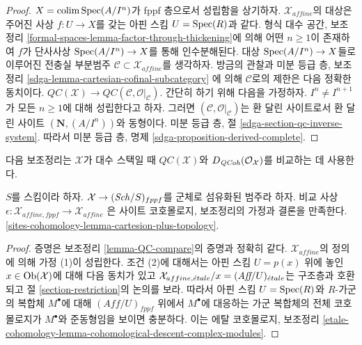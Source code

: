 \begin{proof}
 $X = \mathop{\mathrm{colim}}\nolimits \mathop{\mathrm{Spec}}(A/I^n)$가 fppf 층으로서 성립함을 상기하자.
$\mathcal{X}_{affine}$의 대상은 주어진 사상 $f : U \to X$를 갖는
아핀 스킴 $U = \mathop{\mathrm{Spec}}(R)$과 같다. 형식 대수 공간, 보조정리
\ref{formal-spaces-lemma-factor-through-thickening}에 의해 어떤
$n \geq 1$이 존재하여 $f$가 단사사상
$\mathop{\mathrm{Spec}}(A/I^n) \to X$를 통해 인수분해된다.
대상 $\mathop{\mathrm{Spec}}(A/I^n) \to X$들로 이루어진 전충실 부분범주
$\mathcal{C} \subset \mathcal{X}_{affine}$를 생각하자.
방금의 관찰과 미분 등급 층, 보조정리
\ref{sdga-lemma-cartesian-cofinal-subcategory}
에 의해 $\mathcal{C}$로의 제한은 다음 정확한 동치이다.
$\mathit{QC}(\mathcal{X}) \to
\mathit{QC}(\mathcal{C}, \mathcal{O}|_\mathcal{C})$.
간단히 하기 위해 다음을 가정하자.
$I^n \not = I^{n + 1}$가 모든 $n \geq 1$에 대해 성립한다고 하자.
그러면 $(\mathcal{C}, \mathcal{O}|_\mathcal{C})$는 환 달린 사이트로서
환 달린 사이트 $(\mathbf{N}, (A/I^n))$와 동형이다. 미분 등급 층, 절
\ref{sdga-section-qc-inverse-system}.
따라서 미분 등급 층, 명제
\ref{sdga-proposition-derived-complete}.
\end{proof}

\noindent
다음 보조정리는 $\mathcal{X}$가 대수 스택일 때
$\mathit{QC}(\mathcal{X})$와 $D_{\mathit{QCoh}}(\mathcal{O}_\mathcal{X})$를
비교하는 데 사용한다.

\begin{lemma}
\label{lemma-QC-compare-fppf}
$S$를 스킴이라 하자. $\mathcal{X} \to (\mathit{Sch}/S)_{fppf}$를 군체로
섬유화된 범주라 하자. 비교 사상
$\epsilon : \mathcal{X}_{affine, fppf} \to \mathcal{X}_{affine}$
은 사이트 코호몰로지, 보조정리의 가정과 결론을 만족한다.
\ref{sites-cohomology-lemma-cartesion-plus-topology}.
\end{lemma}

\begin{proof}
증명은 보조정리 \ref{lemma-QC-compare}의 증명과 정확히 같다.
$\mathcal{X}_{affine}$의 정의에 의해 가정 (1)이 성립한다.
조건 (2)에 대해서는 아핀 스킴 $U = p(x)$ 위에 놓인
$x \in \mathop{\mathrm{Ob}}\nolimits(\mathcal{X})$에 대해 다음 동치가 있고
$\mathcal{X}_{affine, {\acute{e}tale}}/x = (\textit{Aff}/U)_{\acute{e}tale}$는 구조층과
호환되고 절 \ref{section-restriction}의 논의를 보라.
따라서 아핀 스킴 $U = \mathop{\mathrm{Spec}}(R)$와 $R$-가군의 복합체 $M^\bullet$에
대해 $(\textit{Aff}/U)_{fppf}$ 위에서 $M^\bullet$에 대응하는 가군
복합체의 전체 코호몰로지가 $M^\bullet$와 준동형임을 보이면 충분하다.
이는 에탈 코호몰로지, 보조정리
\ref{etale-cohomology-lemma-cohomological-descent-complex-modules}.
\end{proof}

















